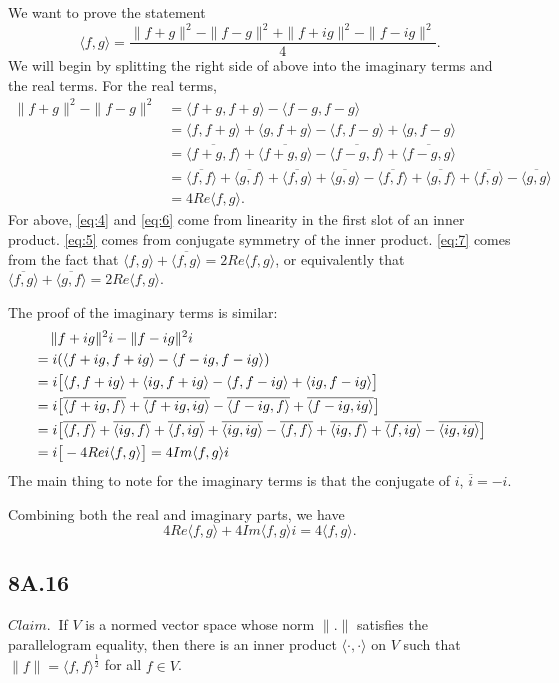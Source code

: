 \documentclass[12pt]{amsart}
\newcommand{\eq}[1]{\begin{equation*}#1\end{equation*}}
\newcommand{\al}[1]{\begin{align*}#1\end{align*}}
\newcommand{\qal}[1]{\begin{align}#1\end{align}}
\newcommand{\<}{\langle}
\renewcommand{\>}{\rangle}
\renewcommand{\-}[1]{\overline{#1}}
\begin{document}
    We want to prove the statement
    \eq{\< f, g \> = \frac{\|f + g \|^2 - \|f - g\|^2 + \|f+ig\|^2 - \|f-ig\|^2}{4}.}
    We will begin by splitting the right side of above into the imaginary terms and the real terms. For the real terms,
    \qal{\|f + g\|^2 - \|f-g\|^2 &= \<f+g, f+g\> - \<f-g, f-g\> \nonumber \\
        &= \<f, f+g\> + \<g, f+g\> - \<f, f-g\> + \<g, f-g\> \label{eq:4}\\
        &= \-{\<f+g, f\>} + \-{\<f+g, g\>} - \-{\<f-g, f\>} + \-{\<f-g, g\>} \label{eq:5}\\
        &= \-{\<f, f\>} + \-{\<g, f\>} + \-{\<f, g\>} + \-{\<g, g\>} - \-{\<f,f\>} +\-{\<g,f\>} + \-{\<f,g\>} - \-{\<g,g\>} \label{eq:6}\\
        &= 4 Re \<f, g\>. \label{eq:7}}
    For above, \eqref{eq:4} and \eqref{eq:6} come from linearity in the first slot of an inner product. \eqref{eq:5} comes from conjugate symmetry of the inner product. \eqref{eq:7} comes from the fact that $\<f, g\> + \-{\<f, g\>} = 2 Re \<f, g\>$, or equivalently that $\-{\<f, g\>} + \-{\<g, f\>} = 2 Re \<f, g\>$.

    The proof of the imaginary terms is similar:
    \al{&\hspace{1.2em}\|f + ig\|^2i - \|f-ig\|^2i \\ &= i(\<f+ig, f+ig\> - \<f-ig, f-ig\>) \\
        &= i\big[\<f, f+ig\> + \<ig, f+ig\> - \<f, f-ig\> + \<ig, f-ig\>\big] \\
        &= i\big[\-{\<f+ig, f\>} + \-{\<f+ig, ig\>} - \-{\<f-ig, f\>} + \-{\<f-ig, ig\>}\big] \\
        &= i\big[\-{\<f, f\>} + \-{\<ig, f\>} + \-{\<f, ig\>} + \-{\<ig, ig\>} - \-{\<f,f\>} +\-{\<ig,f\>} + \-{\<f,ig\>} - \-{\<ig,ig\>}\big] \\
        &= i \big[ -4 Re i \<f, g\> \big] = 4 Im\<f, g\> i}
    The main thing to note for the imaginary terms is that the conjugate of $i$, $\-{i} = -i$.

    Combining both the real and imaginary parts, we have
    \eq{4Re \<f, g\> + 4Im\<f, g\>i = 4\<f, g\>.}
\subsection*{8A.16}

$Claim.~$ If $V$ is a normed vector space whose norm $\|.\|$ satisfies the parallelogram equality, then there is an inner product $\<\cdot,\cdot\>$ on $V$ such that $\|f\| = \<f, f\>^\frac{1}{2}$ for all $f \in V$.
\end{document}
